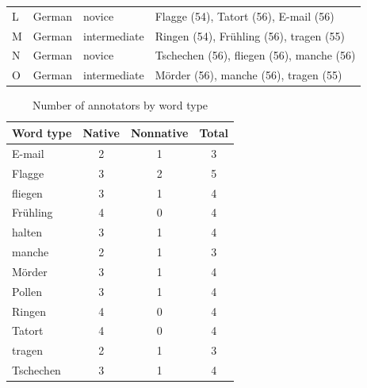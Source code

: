\begin{table}[htb]
\begin{tabularx}{\textwidth}{lllX}
		L & German	 & novice & Flagge (54), \TODO{mention?}  Tatort (56),  E-mail (56) 	 \\
		
		M & 	German	 & intermediate & Ringen (54), \TODO{mention?}  Fr\"{u}hling (56), tragen (55)	 \\
		
		N & German	& novice & Tschechen (56),  fliegen (56),  manche (56)	 \\
		
		O	& German	 & intermediate & Mörder (56),   manche (56),  tragen (55) \\
		
		\bottomrule
		\end{tabularx}
		\label{tab:annotators}
	\end{table}
	
	\begin{table}[htb]
		\centering
		\caption{Number of annotators by word type  }
		\begin{tabular}{lccc}
		\toprule
		Word type \TODO{(Tokens)} 
		&		Native %
		& 	Nonnative %
		& Total %
		\\
		\midrule
		E-mail	& 2 &	1 &	3 \\
		Flagge	& 3	& 2	& 5 \\
		fliegen	& 3	& 1	& 4 \\
		Frühling	& 4	& 0	& 4 \\
		halten	& 3	& 1	& 4 \\
		manche	& 2	& 1	& 3 \\
		Mörder & 	3	& 1	& 4 \\
		Pollen	& 3	& 1	& 4 \\
		Ringen	& 4	& 0	& 4 \\
		Tatort	& 4	& 0	& 4 \\
		tragen	& 2	& 1	& 3 \\
		Tschechen 	& 3	& 1	& 4 \\
		\bottomrule
		\end{tabular}
		\label{tab:annotatorsbyword}
	\end{table}
	
